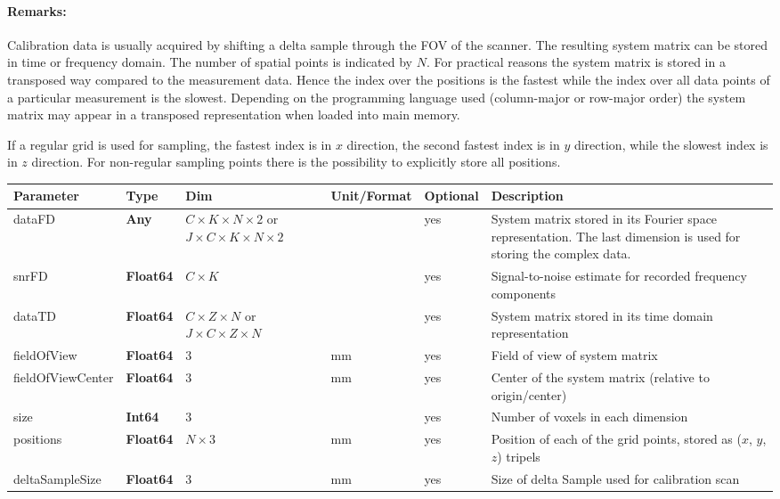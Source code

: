 \documentclass[landscape]{article} %
\newcommand{\inltab}[1]{{\ttfamily\bfseries\color{blue}#1}}
\newcommand{\inlvar}[1]{{\ttfamily#1}}
\begin{document}
\begin{multicols}{2}

\paragraph{Remarks:}
Calibration data is usually acquired by shifting a delta sample through the FOV of the scanner. The resulting system matrix can be stored in time or frequency domain. The number of spatial points is indicated by $N$. For practical reasons the system matrix is stored in a transposed way compared to the measurement data. Hence the index over the positions is the fastest while the index over all data points of a particular measurement is the slowest. Depending on the programming language used (column-major or row-major order) the system matrix may appear in a transposed representation when loaded into main memory.

If a regular grid is used for sampling, the fastest index is in $x$ direction, the second fastest index is in $y$ direction, while the slowest index is in $z$ direction. For non-regular sampling points there is the possibility to explicitly store all positions. \newline

\end{multicols}

\noindent \begin{tabularx}{\columnwidth}{llp{3cm}llX} 
\textbf{Parameter} & \textbf{Type} & \textbf{Dim} & \textbf{Unit/Format} & \textbf{Optional} & \textbf{Description} \\ \hline 
\inlvar{dataFD} & \inltab{Any} & $C \times K \times N \times 2$ or \newline $J \times C \times K \times N \times 2$ & & yes & System matrix stored in its Fourier space representation. The last dimension is used for storing the complex data. \\ \hline
\inlvar{snrFD} & \inltab{Float64} & $C \times K$ &  & yes & Signal-to-noise estimate for recorded frequency components \\ \hline
\inlvar{dataTD} & \inltab{Float64} &  $C \times Z \times N$ or \newline $J \times C \times Z \times N$ & & yes & System matrix stored in its time domain representation \\ \hline 
\inlvar{fieldOfView} & \inltab{Float64} & $3$ & mm & yes & Field of view of system matrix \\ \hline
\inlvar{fieldOfViewCenter} & \inltab{Float64} & $3$ & mm & yes & Center of the system matrix (relative to origin/center) \\ \hline
\inlvar{size} & \inltab{Int64} & $3$ &  & yes & Number of voxels in each dimension \\ \hline
\inlvar{positions} & \inltab{Float64} & $N \times 3$ & mm & yes & Position of each of the grid points, stored as ($x$, $y$, $z$) tripels \\ \hline
\inlvar{deltaSampleSize} & \inltab{Float64} & 3 & mm & yes & Size of delta Sample used for calibration scan \\ \hline
\end{tabularx}
\end{document}
